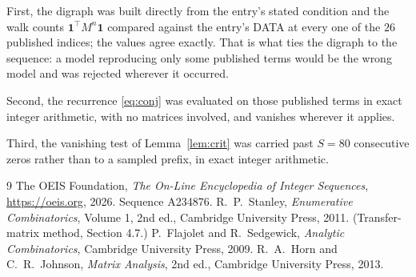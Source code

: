 \documentclass[11pt,a4paper]{article}
\theoremstyle{plain}
\theoremstyle{definition}
\begin{document}
First, the digraph was built directly from the entry's stated condition and the walk counts
$\mathbf{1}^{\!\top}M^{n}\mathbf{1}$ compared against the entry's DATA at every one of
the $26$ published indices; the values agree exactly. That is what ties the digraph to
the sequence: a model reproducing only some published terms would be the wrong model and
was rejected wherever it occurred.

Second, the recurrence \eqref{eq:conj} was evaluated on those published terms in exact
integer arithmetic, with no matrices involved, and vanishes wherever it applies.

Third, the vanishing test of Lemma~\ref{lem:crit} was carried past $S=80$ consecutive
zeros rather than to a sampled prefix, in exact integer arithmetic.

\begin{thebibliography}{9}
 The OEIS Foundation, \emph{The On-Line Encyclopedia of Integer
Sequences}, \url{https://oeis.org}, 2026. Sequence A234876.
 R.~P.~Stanley, \emph{Enumerative Combinatorics}, Volume 1, 2nd ed.,
Cambridge University Press, 2011. (Transfer-matrix method, Section 4.7.)
 P.~Flajolet and R.~Sedgewick, \emph{Analytic Combinatorics}, Cambridge
University Press, 2009.
 R.~A.~Horn and C.~R.~Johnson, \emph{Matrix Analysis}, 2nd ed., Cambridge
University Press, 2013.
\end{thebibliography}
\end{document}
